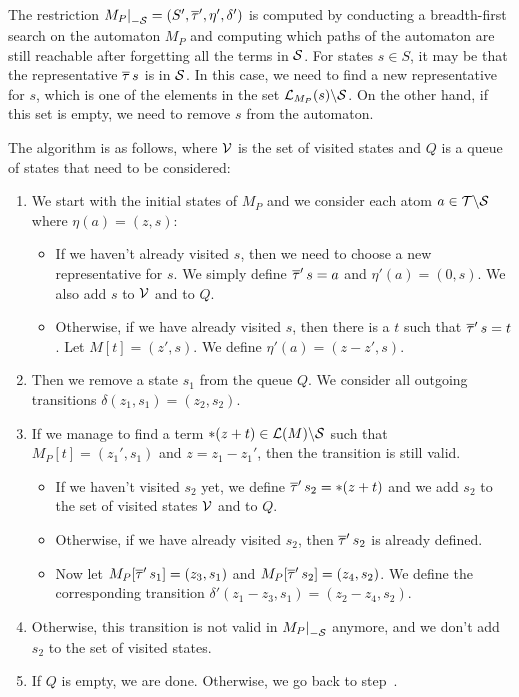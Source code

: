 The restriction $\restr{M_P}{-\Set} = (S', \otau', \eta', \delta')$ is computed by conducting a breadth-first search on the automaton $M_P$
and computing which paths of the automaton are still reachable after forgetting all the terms in $\mathcal{S}$.
For states $s \in S$, it may be that the representative $\overline{\tau}\,s$ is in $\mathcal{S}$.
In this case, we need to find a new representative for $s$, which is one of the elements in the set
$\mathcal{L}_{M_P}(s) \backslash \mathcal{S}$. On the other hand, if this set is empty,
we need to remove $s$ from the automaton.

The algorithm is as follows, where $\mathcal{V}$ is the set of visited states and $Q$ is a queue of states that need to be considered:
\begin{enumerate}
    \item We start with the initial states of $M_P$ and we consider each atom $a \in \mathcal{T} \backslash \mathcal{S}$ where $\eta(a) = (z, s)$:
          \begin{itemize}
              \item If we haven't already visited $s$, then we need to choose a new representative for $s$. We simply define $\overline{\tau}'\,s = a$ and $\eta'(a) = (0, s)$.
                    We also add $s$ to $\mathcal{V}$ and to $Q$.
              \item Otherwise, if we have already visited $s$, then there is a $t$ such that $\overline{\tau}'\,s = t$.
              Let $M[t] = (z', s)$.
              We define $\eta'(a) = (z - z', s)$.
          \end{itemize}
    \item\label{item:next-from-queue} Then we remove a state $s_1$ from the queue $Q$.
          We consider all outgoing transitions $\delta(z_1, s_1) = (z_2, s_2)$.
    \item If we manage to find a term $*(z+t)\in \mathcal{L}(M)\backslash \mathcal{S}$ such that $M_P[t] = (z_1', s_1)$ and $z = z_1 - z_1'$, then the transition is still valid.
          \begin{itemize}
              \item  If we haven't visited $s_2$ yet, we define $\overline{\tau}'\,s_2 = *(z+t)$ and we add $s_2$ to the set of visited states $\mathcal{V}$ and to $Q$.
              \item Otherwise, if we have already visited $s_2$, then $\overline{\tau}'\,s_2$ is already defined.
              \item Now let $M_P[\overline{\tau}'\,s_1] = (z_3, s_1)$ and $M_P[\overline{\tau}'\,s_2] = (z_4, s_2)$.
                    We define the corresponding transition $\delta'(z_1 - z_3, s_1) = (z_2 - z_4, s_2)$.
          \end{itemize}
    \item Otherwise, this transition is not valid in $\restr{M_P}{-\Set}$ anymore, and we don't add $s_2$ to the set of visited states.
    \item If $Q$ is empty, we are done. Otherwise, we go back to step~.
\end{enumerate}

